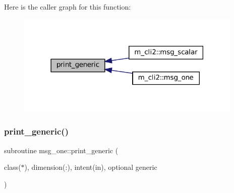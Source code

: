 Here is the caller graph for this function\+:\nopagebreak
\begin{figure}[H]
\begin{center}
\leavevmode
\includegraphics[width=306pt]{M__CLI2_8f90_aaa8ee15f943d8e1543ae35ab732c3cd2_icgraph}
\end{center}
\end{figure}
\mbox{\label{M__CLI2_8f90_a9d5e1620d474ac03a74eeb9b0f7d6ae1}} 
\subsubsection{\texorpdfstring{print\+\_\+generic()}{print\_generic()}\hspace{0.1cm}{\footnotesize\ttfamily [2/2]}}
{\footnotesize\ttfamily subroutine msg\+\_\+one\+::print\+\_\+generic (\begin{DoxyParamCaption}\item[{class($\ast$), dimension(\+:), intent(in), optional}]{generic }\end{DoxyParamCaption})\hspace{0.3cm}{\ttfamily [private]}}

